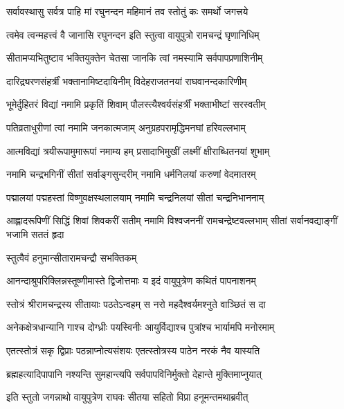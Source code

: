 \twolineshloka
{सर्वावस्थासु सर्वत्र पाहि मां रघुनन्दन}
{महिमानं तव स्तोतुं कः समर्थो जगत्त्रये}%

\twolineshloka
{त्वमेव त्वन्महत्त्वं वै जानासि रघुनन्दन}
{इति स्तुत्वा वायुपुत्रो रामचन्द्रं घृणानिधिम्}%

\twolineshloka
{सीतामप्यभितुष्टाव भक्तियुक्तेन चेतसा}
{जानकि त्वां नमस्यामि सर्वपापप्रणाशिनीम्}%

\twolineshloka
{दारिद्र्यरणसंहर्त्रीं भक्तानामिष्टदायिनीम्}
{विदेहराजतनयां राघवानन्दकारिणीम्}%

\twolineshloka
{भूमेर्दुहितरं विद्यां नमामि प्रकृतिं शिवाम्}
{पौलस्त्यैश्वर्यसंहर्त्रीं भक्ताभीष्टां सरस्वतीम्}%

\twolineshloka
{पतिव्रताधुरीणां त्वां नमामि जनकात्मजाम्}
{अनुग्रहपरामृद्धिमनघां हरिवल्लभाम्}%

\twolineshloka
{आत्मविद्यां त्रयीरूपामुमारूपां नमाम्य हम्}
{प्रसादाभिमुखीं लक्ष्मीं क्षीराब्धितनयां शुभाम्}%

\twolineshloka
{नमामि चन्द्रभगिनीं सीतां सर्वाङ्गसुन्दरीम्}
{नमामि धर्मनिलयां करुणां वेदमातरम्}%

\twolineshloka
{पद्मालयां पद्महस्तां विष्णुवक्षस्थलालयाम्}
{नमामि चन्द्रनिलयां सीतां चन्द्रनिभाननाम्}%

\threelineshloka
{आह्लादरूपिणीं सिद्धिं शिवां शिवकरीं सतीम्}
{नमामि विश्वजननीं रामचन्द्रेष्टवल्लभाम्}
{सीतां सर्वानवद्याङ्गीं भजामि सततं हृदा}%



\onelineshloka
{स्तुत्वैवं हनुमान्सीतारामचन्द्रौ सभक्तिकम्}%

\twolineshloka
{आनन्दाश्रुपरिक्लिन्नस्तूष्णीमास्ते द्विजोत्तमाः}
{य इदं वायुपुत्रेण कथितं पापनाशनम्}%

\twolineshloka
{स्तोत्रं श्रीरामचन्द्रस्य सीतायाः पठतेऽन्वहम्}
{स नरो महदैश्वर्यमश्नुते वाञ्छितं स दा}%

\twolineshloka
{अनेकक्षेत्रधान्यानि गाश्च दोग्ध्रीः पयस्विनीः}
{आयुर्विद्याश्च पुत्रांश्च भार्यामपि मनोरमाम्}%

\twolineshloka
{एतत्स्तोत्रं सकृ द्विप्राः पठन्नाप्नोत्यसंशयः}
{एतत्स्तोत्रस्य पाठेन नरकं नैव यास्यति}%

\twolineshloka
{ब्रह्महत्यादिपापानि नश्यन्ति सुमहान्त्यपि}
{सर्वपापविनिर्मुक्तो देहान्ते मुक्तिमाप्नुयात्}%

\twolineshloka
{इति स्तुतो जगन्नाथो वायुपुत्रेण राघवः}
{सीतया सहितो विप्रा हनूमन्तमथाब्रवीत्}%

